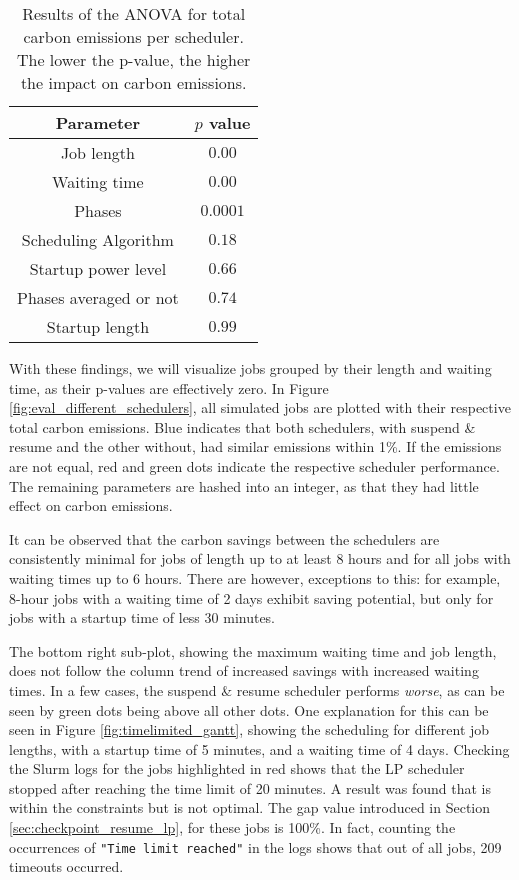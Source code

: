 \begin{table}[h!]
    \centering
    \begin{tabular}{|c|c|}
    \hline
        Parameter & $p$ value\\ \hline
        Job length & $0.00$ \\ \hline
        Waiting time  & $0.00$ \\ \hline
        Phases  & $0.0001$ \\ \hline
        Scheduling Algorithm  & $0.18$ \\ \hline
        Startup power level & $0.66$ \\ \hline
        Phases averaged or not & $0.74$ \\ \hline
        Startup length & $0.99$ \\ \hline
    \end{tabular}
    \caption{Results of the ANOVA for total carbon emissions per scheduler. The lower the p-value, the higher the impact on carbon emissions.}
\label{tab:scheduler_anova}
\end{table}

With these findings, we will visualize jobs grouped by their length and waiting time, as their p-values are effectively zero. 
In Figure \ref{fig:eval_different_schedulers}, all simulated jobs are plotted with their respective total carbon emissions. Blue indicates that both schedulers, with suspend \& resume and the other without, had similar emissions within 1\%. 
If the emissions are not equal, red and green dots indicate the respective scheduler performance.
The remaining parameters are hashed into an integer, as that they had little effect on carbon emissions.

It can be observed that the carbon savings between the schedulers are consistently minimal for jobs of length up to at least 8 hours and for all jobs with waiting times up to 6 hours.
There are however, exceptions to this: for example, 8-hour jobs with a waiting time of 2 days exhibit saving potential, but only for jobs with a startup time of less 30 minutes.

The bottom right sub-plot, showing the maximum waiting time and job length, does not follow the column trend of increased savings with increased waiting times. In a few cases, the suspend \& resume scheduler performs \emph{worse}, as can be seen by green dots being above all other dots.
One explanation for this can be seen in Figure \ref{fig:timelimited_gantt}, showing the scheduling for different job lengths, with a startup time of 5 minutes, and a waiting time of 4 days.
Checking the Slurm logs for the jobs highlighted in red shows that the LP scheduler stopped after reaching the time limit of 20 minutes.
A result was found that is within the constraints but is not optimal.
The gap value introduced in Section \ref{sec:checkpoint_resume_lp}, for these jobs is 100\%.
In fact, counting the occurrences of \verb|"Time limit reached"| in the logs shows that out of all jobs, 209 timeouts occurred. 

